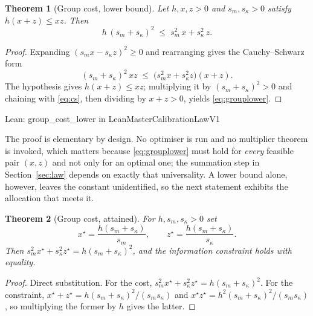 \documentclass[conference]{IEEEtran}
\newtheorem{theorem}{Theorem}
\theoremstyle{definition}
\newcommand{\lean}[1]{\textsf{\footnotesize #1}}
\newcommand{\leanbox}[1]{%
  \par\vspace{2pt}\noindent
  {\footnotesize\textsf{Lean: #1}}\par\vspace{2pt}}
\begin{document}
\begin{theorem}[Group cost, lower bound]
\label{thm:grouplower}
Let $h,x,z>0$ and $s_{m},s_{\kappa}>0$ satisfy $h(x+z)\le xz$. Then
\begin{equation}
h\,(s_{m}+s_{\kappa})^{2} \;\le\; s_{m}^{2}\,x + s_{\kappa}^{2}\,z .
\label{eq:grouplower}
\end{equation}
\end{theorem}

\begin{proof}
Expanding $(s_{m}x-s_{\kappa}z)^{2}\ge0$ and rearranging gives the Cauchy--Schwarz form
\begin{equation}
(s_{m}+s_{\kappa})^{2}\,xz \;\le\; \bigl(s_{m}^{2}x+s_{\kappa}^{2}z\bigr)(x+z).
\label{eq:cs}
\end{equation}
The hypothesis gives $h(x+z)\le xz$; multiplying it by $(s_{m}+s_{\kappa})^{2}>0$ and
chaining with \eqref{eq:cs}, then dividing by $x+z>0$, yields \eqref{eq:grouplower}.
\end{proof}

\leanbox{\lean{group\_cost\_lower} in \lean{LeanMasterCalibrationLawV1}}

The proof is elementary by design. No optimiser is run and no multiplier theorem is invoked,
which matters because \eqref{eq:grouplower} must hold for \emph{every} feasible pair
$(x,z)$ and not only for an optimal one; the summation step in
Section~\ref{sec:law} depends on exactly that universality. A lower bound alone, however,
leaves the constant unidentified, so the next statement exhibits the allocation that meets
it.

\begin{theorem}[Group cost, attained]
\label{thm:groupattained}
For $h,s_{m},s_{\kappa}>0$ set
\begin{equation}
x^{\star}=\frac{h(s_{m}+s_{\kappa})}{s_{m}},
\qquad
z^{\star}=\frac{h(s_{m}+s_{\kappa})}{s_{\kappa}} .
\label{eq:groupsplit}
\end{equation}
Then $s_{m}^{2}x^{\star}+s_{\kappa}^{2}z^{\star}=h(s_{m}+s_{\kappa})^{2}$, and the
information constraint holds with equality.
\end{theorem}

\begin{proof}
Direct substitution. For the cost,
$s_{m}^{2}x^{\star}+s_{\kappa}^{2}z^{\star}=h(s_{m}+s_{\kappa})^{2}$. For the constraint,
$x^{\star}+z^{\star}=h(s_{m}+s_{\kappa})^{2}/(s_{m}s_{\kappa})$ and
$x^{\star}z^{\star}=h^{2}(s_{m}+s_{\kappa})^{2}/(s_{m}s_{\kappa})$, so multiplying the
former by $h$ gives the latter.
\end{proof}
\end{document}
